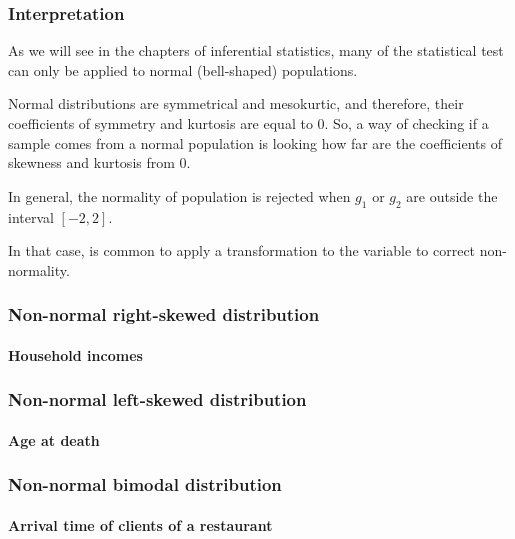\begin{frame}
\frametitle{Interpretation}
As we will see in the chapters of inferential statistics, many of the statistical test can only be applied to normal (bell-shaped) populations. 

Normal distributions are symmetrical and mesokurtic, and therefore, their coefficients of symmetry and kurtosis are equal to 0. So, a way of checking if a sample comes from a normal population is looking how far are the coefficients of skewness and kurtosis from 0. 
 
In general, the normality of population is rejected when $g_1$ or $g_2$ are outside the interval $[-2,2]$.

In that case, is common to apply a transformation to the variable to correct non-normality. 
\end{frame}


\begin{frame}
\frametitle{Non-normal right-skewed distribution}
\framesubtitle{Household incomes}
\begin{center}
\scalebox{0.6}{}
\end{center} 
\end{frame}


\begin{frame}
\frametitle{Non-normal left-skewed distribution}
\framesubtitle{Age at death}
\begin{center}
\scalebox{0.6}{}
\end{center} 
\end{frame}


\begin{frame}
\frametitle{Non-normal bimodal distribution}
\framesubtitle{Arrival time of clients of a restaurant}
\begin{center}
\scalebox{0.6}{}
\end{center} 
\end{frame}



